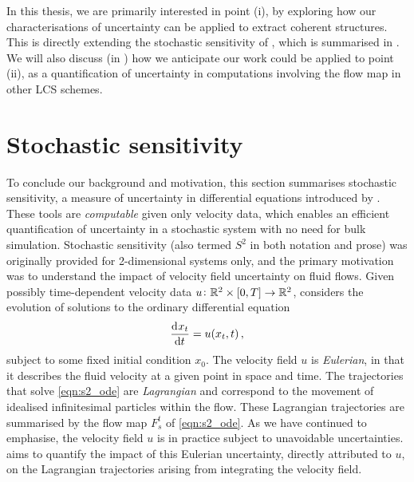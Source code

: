 In this thesis, we are primarily interested in point (i), by exploring how our characterisations of uncertainty can be applied to extract coherent structures.
This is directly extending the stochastic sensitivity of \citet{Balasuriya_2020_StochasticSensitivityComputable}, which is summarised in .
We will also discuss (in ) how we anticipate our work could be applied to point (ii), as a quantification of uncertainty in computations involving the flow map in other LCS schemes.




\section{Stochastic sensitivity}\label{sec:s2_summ}
To conclude our background and motivation, this section summarises stochastic sensitivity, a measure of uncertainty in differential equations introduced by \citet{Balasuriya_2020_StochasticSensitivityComputable}.
These tools are \emph{computable} given only velocity data, which enables an efficient quantification of uncertainty in a stochastic system with no need for bulk simulation.
Stochastic sensitivity (also termed \(S^2\) in both notation and prose) was originally provided for 2-dimensional systems only, and the primary motivation was to understand the impact of velocity field uncertainty on fluid flows.
Given possibly time-dependent velocity data \(u\colon \mathbb{R}^2 \times [0,T] \to \mathbb{R}^2\), \citet{Balasuriya_2020_StochasticSensitivityComputable} considers the evolution of solutions to the ordinary differential equation
\begin{equation}\label{eqn:s2_ode}
	\dod{x_t}{t} = u\!\left(x_t, t\right),
\end{equation}
subject to some fixed initial condition \(x_0\).
The velocity field \(u\) is \emph{Eulerian}, in that it describes the fluid velocity at a given point in space and time.
The trajectories that solve \cref{eqn:s2_ode} are \emph{Lagrangian} and correspond to the movement of idealised infinitesimal particles within the flow.
These Lagrangian trajectories are summarised by the flow map \(F_s^t\) of \cref{eqn:s2_ode}.
As we have continued to emphasise, the velocity field \(u\) is in practice subject to unavoidable uncertainties.
\citet{Balasuriya_2020_StochasticSensitivityComputable} aims to quantify the impact of this Eulerian uncertainty, directly attributed to \(u\), on the Lagrangian trajectories arising from integrating the velocity field.

